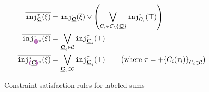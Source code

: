 
\begin{figure}[ht]

  \begin{mathpar}
  \end{mathpar}


  \begin{align*}
    \cdual{\cinj{\tagC}{\tau}{\xi}}              & = \cinj{\tagC}{\tau}{\cdual{\xi}} \vee \left(
    \bigvee_{C_i \in \tagset \setminus \{\tagC\}} \cinj{C_i}{\tau}{\ctruth}
    \right)                                                                                                      \\
    \cdual{\cinj{\tagehole{u}}{\tau}{\xi}}       & = \bigvee_{\tagC_i \in \tagset} \cinj{\tagC_i}{\tau}{\ctruth} \\
    \cdual{\cinj{\taghole{\tagC}{u}}{\tau}{\xi}} & = \bigvee_{\tagC_i \in \tagset} \cinj{\tagC_i}{\tau}{\ctruth}
    \qquad \left(\text{where }\tau = \tlabeledsum{C_i(\tau_i)}_{C_i \in \tagset}\right)
  \end{align*}


  \begin{mathpar}
  \end{mathpar}


  \begin{mathpar}

  \end{mathpar}

  \caption{Constraint satisfaction rules for labeled sums}
  \label{fig:labeled-sums-constraint-rules}
\end{figure}
